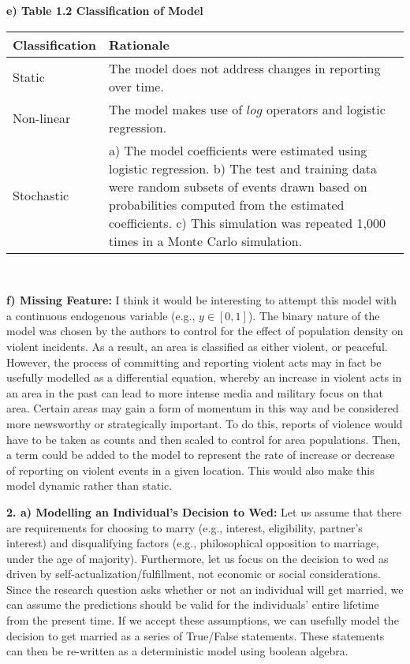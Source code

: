 \documentclass{report}
\begin{document}
\textbf{e) Table 1.2 Classification of Model}\\
\begin{tabular}{p{1.75cm}p{15.25cm} }
  Classification & Rationale \\
  \hline
  Static & The model does not address changes in reporting over time. 
  \\
  \hline
  Non-linear & The model makes use of $log$ operators and logistic regression.
  \\
  \hline
  Stochastic & a) The model coefficients were estimated using logistic regression. b) The test and training data were random subsets of events drawn based on probabilities computed from the estimated coefficients. c) This simulation was repeated 1,000 times in a Monte Carlo simulation.
\end{tabular}

\

\textbf{f) Missing Feature: }I think it would be interesting to attempt this model with a continuous endogenous variable (e.g., $y \in [0,1]$). The binary nature of the model was chosen by the authors to control for the effect of population density on violent incidents. As a result, an area is classified as either violent, or peaceful. However, the process of committing and reporting violent acts may in fact be usefully modelled as a differential equation, whereby an increase in violent acts in an area in the past can lead to more intense media and military focus on that area. Certain areas may gain a form of momentum in this way and be considered more newsworthy or strategically important. To do this, reports of violence would have to be taken as counts and then scaled to control for area populations. Then, a term could be added to the model to represent the rate of increase or decrease of reporting on violent events in a given location. This would also make this model dynamic rather than static. 

\newpage
\textbf{2. a) Modelling an Individual's Decision to Wed: }Let us assume that there are requirements for choosing to marry (e.g., interest, eligibility, partner's interest) and disqualifying factors (e.g., philosophical opposition to marriage, under the age of majority). Furthermore, let us focus on the decision to wed as driven by self-actualization/fulfillment, not economic or social considerations. Since the research question asks whether or not an individual will get married, we can assume the predictions should be valid for the individuals' entire lifetime from the present time. If we accept these assumptions, we can usefully model the decision to get married as a series of True/False statements. These statements can then be re-written as a deterministic model using boolean algebra. 
\end{document}
